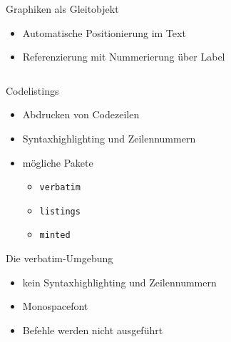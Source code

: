 \documentclass[presentation,aspectratio=169]{beamer}
\begin{document}
\begin{frame}{Graphiken als Gleitobjekt}
  \begin{itemize}
    \item Automatische Positionierung im Text
    \item Referenzierung mit Nummerierung über Label
  \end{itemize}
  \begin{minipage}[c]{.4\textwidth}
    
  \end{minipage}
  \hfill
  \begin{minipage}[c]{.5\textwidth}
    \inputminted{latex}{codebeispiele/graphics-figure.tex}
  \end{minipage}
\end{frame}

\begin{frame}[fragile]{Codelistings}
  \begin{itemize}
    \item Abdrucken von Codezeilen
    \item Syntaxhighlighting und Zeilennummern
    \item mögliche Pakete
      \begin{itemize}
        \item \verb|verbatim|
        \item \verb|listings|
        \item \verb|minted|
      \end{itemize}
  \end{itemize}
\end{frame}

\begin{frame}[fragile]{Die verbatim-Umgebung}
  \begin{itemize}
    \item kein Syntaxhighlighting und Zeilennummern
    \item Monospacefont
    \item Befehle werden nicht ausgeführt
  \end{itemize}
  \begin{minipage}{.4\textwidth}
    
  \end{minipage}
  \hfill
  \begin{minipage}{.5\textwidth}
    \inputminted{latex}{codebeispiele/listings-verbatim.tex}
  \end{minipage}
\end{frame}
\end{document}

